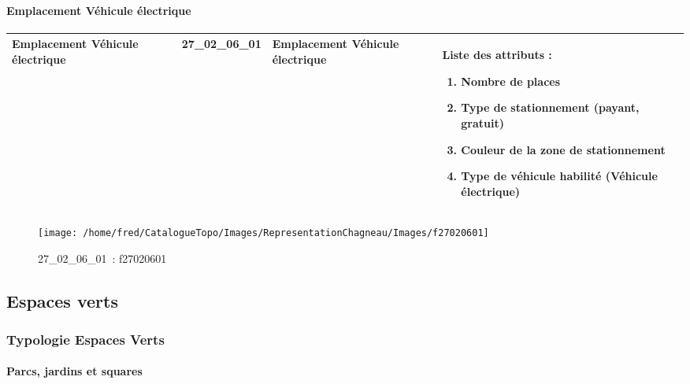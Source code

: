 \documentclass[12pt,titlepage]{book}
\begin{document}
\paragraph{Emplacement Véhicule électrique}
\noindent
\vspace{\baselineskip}

\renewcommand{\arraystretch}{1.2}
\begin{supertabular}{|p{10cm}|c|p{13cm}|p{12cm}|}
 Emplacement Véhicule électrique & 27\_02\_06\_01 & Emplacement Véhicule électrique & Liste des attributs :
\begin{enumerate}
  \item Nombre de places  \item Type de stationnement (payant, gratuit)  \item Couleur de la zone de stationnement  \item Type de véhicule habilité (Véhicule électrique)\end{enumerate}
\\
\hline
\end{supertabular}
\begin{figure}[h!]
  \hfill         %
  \begin{minipage}[t]{3cm}
    \begin{center}
      \texttt{[image: /home/fred/CatalogueTopo/Images/RepresentationChagneau/Images/f27020601]}
      \caption[~27\_02\_06\_01]{\small{27\_02\_06\_01~:} \tiny{f27020601}}\label{f27020601}
    \end{center}
  \end{minipage}
\end{figure}
\subsection{Espaces verts}
\subsubsection{\large Typologie Espaces Verts}
\paragraph{Parcs, jardins et squares}
\noindent
\vspace{\baselineskip}
\end{document}
